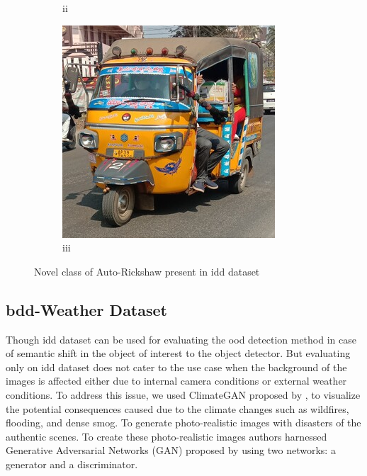 \begin{enumerate}
\begin{figure}[H]
\begin{subfigure}[b]{0.2\textwidth}
               \caption{ii}
               \label{Auto_2}
            \end{subfigure}
            \begin{subfigure}[b]{0.2\textwidth}
               \includegraphics[width=\textwidth]{images/dataset_images/bdd_samples/Auto_3.jpg}
               \caption{iii}
               \label{Auto_3}
            \end{subfigure}
         \caption[Auto-Rickshaw in \acrshort{idd} dataset]{Novel class of Auto-Rickshaw present in \acrshort{idd} dataset}
         \label{fig:novel_auto_rickshaw}
        \end{figure}
    \end{enumerate}
    
    \subsection{\acrshort{bdd}-Weather Dataset}
    \label{bdd100k_weather}
    Though \acrshort{idd} dataset can be used for evaluating the \acrshort{ood} detection method in case of semantic shift in the object of interest to the object detector. But evaluating only on \acrshort{idd} dataset does not cater to the use case when the background of the images is affected either due to internal camera conditions or external weather conditions. To address this issue, we used ClimateGAN proposed by \citet{climategan}, to visualize the potential consequences caused due to the climate changes such as wildfires, flooding, and dense smog. To generate photo-realistic images with disasters of the authentic scenes. To create these photo-realistic images authors harnessed Generative Adversarial Networks (GAN) proposed by \citet{GAN} using two networks: a generator and a discriminator.
    
